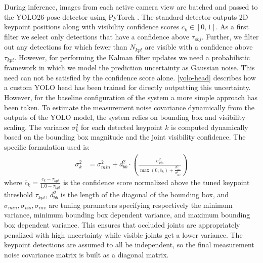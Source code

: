 During inference, images from each active camera view are batched and passed to the YOLO26-pose detector using PyTorch \parencite{paszke2019pytorch,ansel2024pytorch}. The standard detector outputs 2D keypoint positions along with visibility confidence scores $c_k \in [0, 1]$. As a first filter we select only detections that have a confidence above $\tau_{obj}$. Further, we filter out any detections for which fewer than $N_{kpt}$ are visible with a confidence above $\tau_{kpt}$. However, for performing the Kalman filter updates we need a probabilistic framework in which we model the prediction uncertainty as Gaussian noise. This need can not be satisfied by the confidence score alone. \cref{yolo-head} describes how a custom YOLO head has been trained for directly outputting this uncertainty. However, for the baseline configuration of the system a more simple approach has been taken. To estimate the measurement noise covariance dynamically from the outputs of the YOLO model, the system relies on bounding box and visibility scaling. The variance $\sigma_k^2$ for each detected keypoint $k$ is computed dynamically based on the bounding box magnitude and the joint visibility confidence. The specific formulation used is:
\begin{align*}
    \sigma_k^2 &= \sigma_{min}^2 + d_{bb}^2 \cdot \left( \frac{\sigma_{vis}^2}{\max(0, \bar{c}_k) + \frac{\sigma_{vis}^2}{\sigma_{inv}^2}} \right)
\end{align*}
where $\bar{c}_k = \frac{c_k - \tau_{kpt}}{1.0 - \tau_{kpt}}$ is the confidence score normalized above the tuned keypoint threshold $\tau_{kpt}$, $d_{bb}^2$ is the length of the diagonal of the bounding box, and $\sigma_{min}, \sigma_{vis}, \sigma_{inv}$ are tuning parameters specifying respectively the minimum variance, minimum bounding box dependent variance, and maximum bounding box dependent variance. This ensures that occluded joints are appropriately penalized with high uncertainty while visible joints get a lower variance. The keypoint detections are assumed to all be independent, so the final measurement noise covariance matrix is built as a diagonal matrix.

